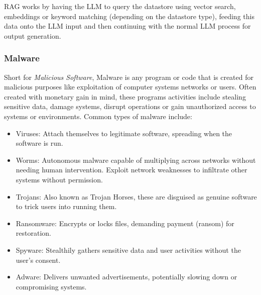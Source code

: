 RAG works by having the LLM to query the datastore using vector search, embeddings or keyword
matching (depending on the datastore type), feeding this data onto the LLM input and then
continuing with the normal LLM process for output generation.

\subsubsection{Malware}
Short for \textit{Malicious Software}, Malware is any program or code that is created for malicious
purposes like exploitation of computer systems networks or users. Often created with monetary gain
in mind, these programs activities include stealing sensitive data, damage systems, disrupt
operations or gain unauthorized access to systems or environments. Common types of malware include:
\begin{itemize}
	\item Viruses: Attach themselves to legitimate software, spreading when the software is run.
	\item Worms: Autonomous malware capable of multiplying across networks without needing human
	      intervention. Exploit network weaknesses to infiltrate other systems without permission.
	\item Trojans: Also known as Trojan Horses, these are disguised as genuine software to trick users into
	      running them.
	\item Ransomware: Encrypts or locks files, demanding payment (ransom) for restoration.
	\item Spyware: Stealthily gathers sensitive data and user activities without the user’s consent.
	\item Adware: Delivers unwanted advertisements, potentially slowing down or compromising systems.
\end{itemize}

